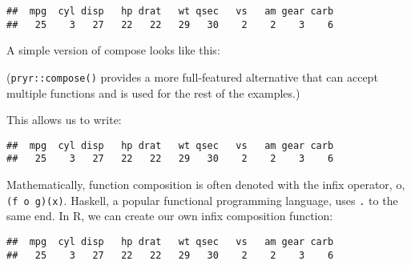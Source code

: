 \begin{verbatim}
##  mpg  cyl disp   hp drat   wt qsec   vs   am gear carb 
##   25    3   27   22   22   29   30    2    2    3    6
\end{verbatim}

A simple version of compose looks like this:

\begin{Shaded}
\begin{Highlighting}[]
\StringTok{ }
  \NormalTok{(}
\NormalTok{\}}
\end{Highlighting}
\end{Shaded}

(\texttt{pryr::compose()} provides a more full-featured alternative that
can accept multiple functions and is used for the rest of the examples.)

This allows us to write:

\begin{Shaded}
\begin{Highlighting}[]
\end{Highlighting}
\end{Shaded}

\begin{verbatim}
##  mpg  cyl disp   hp drat   wt qsec   vs   am gear carb 
##   25    3   27   22   22   29   30    2    2    3    6
\end{verbatim}

Mathematically, function composition is often denoted with the infix
operator, o, \texttt{(f\ o\ g)(x)}. Haskell, a popular functional
programming language, uses \texttt{.} to the same end. In R, we can
create our own infix composition function: 

\begin{Shaded}
\end{Shaded}

\begin{verbatim}
##  mpg  cyl disp   hp drat   wt qsec   vs   am gear carb 
##   25    3   27   22   22   29   30    2    2    3    6
\end{verbatim}

